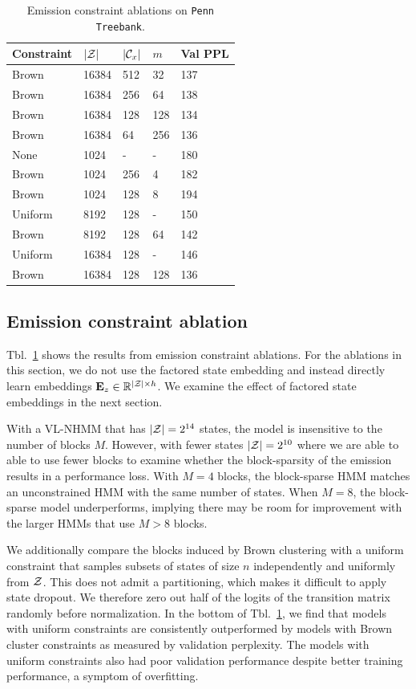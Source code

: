 \documentclass[11pt,a4paper]{article}
\begin{document}
\begin{table}[t]
\centering
\begin{tabular}{lllll}
\toprule
Constraint & $|\mathcal{Z}|$ & $|\mathcal{C}_x|$ & $m$ & Val PPL\\
\midrule
Brown & 16384 & 512 & 32  & 137\\
Brown & 16384 & 256 & 64  & 138\\
Brown & 16384 & 128 & 128 & 134\\
Brown & 16384 & 64  & 256 & 136\\
\midrule
None  & 1024 & - & - & 180\\
Brown & 1024 & 256 & 4 & 182\\
Brown & 1024 & 128 & 8 & 194\\
\midrule
Uniform    & 8192    & 128    & -   & 150\\
Brown      & 8192    & 128    & 64  & 142\\
Uniform    & 16384   & 128    & -   & 146\\
Brown      & 16384   & 128    & 128 & 136\\
\bottomrule
\end{tabular}
\caption{\label{tbl:constraint-ablation}
Emission constraint ablations on \texttt{Penn Treebank}.
}
\end{table}


\subsection{Emission constraint ablation}
Tbl.~\ref{tbl:constraint-ablation} shows the results from 
emission constraint ablations.
For the ablations in this section,
we do not use the factored state embedding
and instead directly learn embeddings $\mathbf{E}_z\in\mathbb{R}^{|\mathcal{Z}|\times h}$.
We examine the effect of factored state embeddings in the next section.

With a VL-NHMM that has $|\mathcal{Z}|=2^{14}$ states,
the model is insensitive to the number of blocks $M$.
However, with fewer states $|\mathcal{Z}|=2^{10}$ where we are able to
able to use fewer blocks to examine whether the block-sparsity
of the emission results in a performance loss.
With $M=4$ blocks, the block-sparse HMM matches an unconstrained HMM
with the same number of states.
When $M=8$, the block-sparse model underperforms,
implying there may be room for improvement with the larger
HMMs that use $M > 8$ blocks.

We additionally compare the blocks induced by Brown clustering with a uniform
constraint that samples subsets of states of size $n$
independently and uniformly from $\mathcal{Z}$.
This does not admit a partitioning, which makes it difficult to apply state dropout.
We therefore zero out half of the logits of the transition matrix randomly
before normalization.
In the bottom of Tbl.~\ref{tbl:constraint-ablation},
we find that models with uniform constraints
are consistently outperformed by models with Brown cluster constraints
as measured by validation perplexity.
The models with uniform constraints also had poor validation performance
despite better training performance, a symptom of overfitting.
\end{document}

